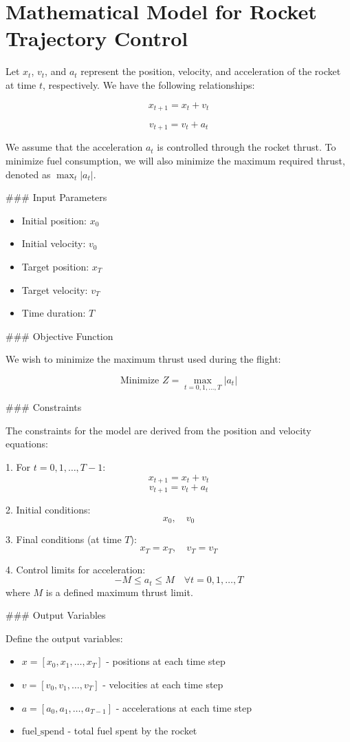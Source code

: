 \documentclass{article}
\begin{document}
\section*{Mathematical Model for Rocket Trajectory Control}

Let \( x_t \), \( v_t \), and \( a_t \) represent the position, velocity, and acceleration of the rocket at time \( t \), respectively. We have the following relationships:

\[
x_{t+1} = x_t + v_t
\]

\[
v_{t+1} = v_t + a_t
\]

We assume that the acceleration \( a_t \) is controlled through the rocket thrust. To minimize fuel consumption, we will also minimize the maximum required thrust, denoted as \( \max_t |a_t| \).

### Input Parameters

\begin{itemize}
    \item Initial position: \( x_0 \)
    \item Initial velocity: \( v_0 \)
    \item Target position: \( x_T \)
    \item Target velocity: \( v_T \)
    \item Time duration: \( T \)
\end{itemize}

### Objective Function

We wish to minimize the maximum thrust used during the flight:

\[
\text{Minimize } Z = \max_{t=0,1,\ldots,T} |a_t|
\]

### Constraints

The constraints for the model are derived from the position and velocity equations:

1. For \( t = 0, 1, \ldots, T-1 \):
   \[
   x_{t+1} = x_t + v_t
   \]
   \[
   v_{t+1} = v_t + a_t
   \]

2. Initial conditions:
   \[
   x_0, \quad v_0
   \]

3. Final conditions (at time \( T \)):
   \[
   x_T = x_T, \quad v_T = v_T
   \]

4. Control limits for acceleration:
   \[
   -M \leq a_t \leq M \quad \forall t = 0, 1, \ldots, T
   \]
   where \( M \) is a defined maximum thrust limit.

### Output Variables

Define the output variables:

\begin{itemize}
    \item \( x = [x_0, x_1, \ldots, x_T] \) - positions at each time step
    \item \( v = [v_0, v_1, \ldots, v_T] \) - velocities at each time step
    \item \( a = [a_0, a_1, \ldots, a_{T-1}] \) - accelerations at each time step
    \item \( \text{fuel\_spend} \) - total fuel spent by the rocket
\end{itemize}
\end{document}
